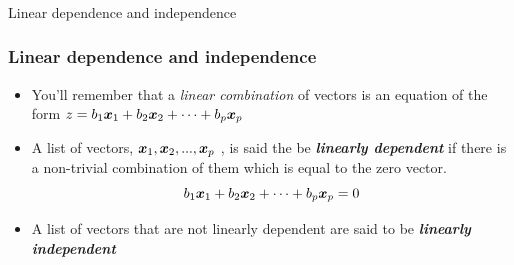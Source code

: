 \documentclass{beamer}
\begin{document}
\begin{frame}
  \frametitle{}
\begin{center}
\begin{Huge}
{\rmfamily Linear dependence and independence}
\end{Huge}
\end{center}
\end{frame}

\begin{frame}
  \frametitle{Linear dependence and independence}

\begin{itemize}
\item You'll remember that a \emph{linear combination} of vectors is an equation of the form $z = b_1 \bm{x}_1 + b_2 \bm{x}_2 + \cdots + b_p \bm{x}_p$

\item A list of vectors, $\bm{x}_1, \bm{x}_2, ..., \bm{x}_p$ , is said the be \emph{\textbf{linearly dependent}} if there is a non-trivial combination of them which is  equal to the zero vector.
\[
 b_1 \bm{x}_1 + b_2 \bm{x}_2 + \cdots + b_p \bm{x}_p = 0
\]

\item A list of vectors that are not linearly dependent are said to be \emph{\textbf{linearly independent}} 

\end{itemize}

\end{frame}
\end{document}
